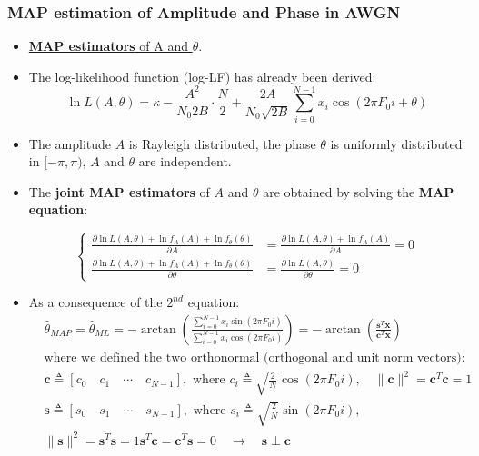 \subsubsection{MAP estimation of Amplitude and Phase in AWGN}
\begin{itemize}
\item \underline{\textbf{MAP estimators} of A and \(\theta\)}.
\item The log-likelihood function (log-LF) has already been derived:
\[
\ln L(A, \theta) = \kappa - \frac{A^2}{N_0 2B} \cdot \frac{N}{2} + \frac{2A}{N_0 \sqrt{2B}} \sum_{i=0}^{N-1} x_i \cos(2\pi F_0 i + \theta)
\]
\item The amplitude \(A\) is Rayleigh distributed, the phase \(\theta\) is uniformly distributed in \([-\pi,\pi)\), \(A\) and \(\theta\) are independent.
\item The \textbf{joint MAP estimators} of \(A\) and \(\theta\) are obtained by solving the \textbf{MAP equation}:

\[
\begin{cases}
\frac{\partial \ln L(A, \theta) + \ln f_A(A) + \ln f_\theta(\theta)}{\partial A} &= \frac{\partial \ln L(A, \theta) + \ln f_A(A)}{\partial A} = 0 \\[10pt]
\frac{\partial \ln L(A, \theta) + \ln f_A(A) + \ln f_\theta(\theta)}{\partial \theta} &= \frac{\partial \ln L(A, \theta)}{\partial \theta} = 0
\end{cases}
\]
\item As a consequence of the \(2^{nd}\) equation:
\begin{align*}
&\hat{\theta}_{MAP} = \hat{\theta}_{ML} = -\arctan \left( \frac{\sum_{i=0}^{N-1} x_i \sin(2\pi F_0 i)}{\sum_{i=0}^{N-1} x_i \cos(2\pi F_0 i)} \right) = -\arctan \left( \frac{\mathbf{s}^T \mathbf{x}}{\mathbf{c}^T \mathbf{x}} \right)\\[5pt]
&\text{where we defined the two orthonormal (orthogonal and unit norm vectors):}\\[5pt]
&\mathbf{c} \triangleq \left[ c_0 \quad c_1 \quad \cdots \quad c_{N-1} \right], \text{ where } c_i \triangleq \sqrt{\frac{2}{N}} \cos(2\pi F_0 i), \quad \|\mathbf{c}\|^2 = \mathbf{c}^T \mathbf{c} = 1\\[5pt]
&\mathbf{s} \triangleq \left[ s_0 \quad s_1 \quad \cdots \quad s_{N-1} \right], \text{ where } s_i \triangleq \sqrt{\frac{2}{N}} \sin(2\pi F_0 i), \\[5pt]
&\|\mathbf{s}\|^2 = \mathbf{s}^T \mathbf{s} = 1
\mathbf{s}^T \mathbf{c} = \mathbf{c}^T \mathbf{s} = 0 \quad \rightarrow \quad \mathbf{s} \perp \mathbf{c}
\end{align*}



\end{itemize}
